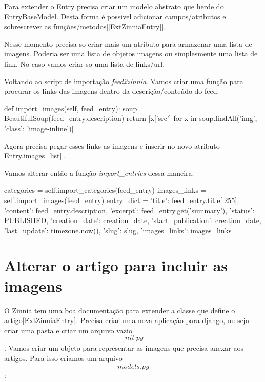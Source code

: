 
Para extender o Entry precisa criar um modelo abstrato que herde do
EntryBaseModel. Desta forma é possivel adicionar campos/atributos e sobrescrever as
funções/metodos[\ref{ExtZinniaEntry}]. 

Nesse momento precisa so criar mais um atributo para armazenar uma
lista de imagens. Poderia ser uma lista de objetos imagens ou
simplesmente uma lista de link. No caso vamos criar so uma lista de
links/url.

Voltando ao script de importação \emph{feed2zinnia}. Vamos criar uma
função para procurar os links das imagens dentro da descrição/conteúdo
do feed:

\begin{code}
def import_images(self, feed_entry):
    soup = BeautifulSoup(feed_entry.description)
    return [x['src'] for x in soup.findAll('img', {'class': 'image-inline'})]
\end{code}

Agora precisa pegar esses links as imagens e inserir no novo atributo
Entry.images_list[].

Vamos alterar então a função \emph{import_entries} dessa maneira:

\begin{code}
categories = self.import_categories(feed_entry)
            images_links = self.import_images(feed_entry)
            entry_dict = {'title': feed_entry.title[:255],
                          'content': feed_entry.description,
                          'excerpt': feed_entry.get('summary'),
                          'status': PUBLISHED,
                          'creation_date': creation_date,
                          'start_publication': creation_date,
                          'last_update': timezone.now(),
                          'slug': slug,
                          'images_links': images_links}
\end{code}

\section{Alterar o artigo para incluir as imagens}
O Zinnia tem uma boa documentação para extender a classe que define o
artigo\ref{ExtZinniaEntry}. Precisa criar uma nova aplicação para
django, ou seja criar uma pasta e criar um arquivo vazio $$
__init__.py $$. Vamos criar um objeto para representar as imagens que
precisa anexar aos artigos. Para isso criamos um arquivo $$
models.py $$:

